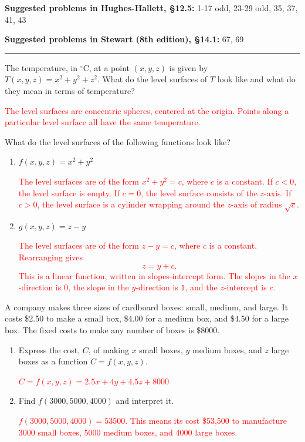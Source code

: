 \documentclass[12pt,reqno]{amsart}
\begin{document}
\textbf{Suggested problems in Hughes-Hallett, \S12.5:} 1-17 odd, 23-29 odd, 35, 37, 41, 43  \medskip

\textbf{Suggested problems in Stewart (8th edition), \S14.1:} 67, 69

\bigskip
\hrule

\bigskip

\prob The temperature, in $^\circ$C, at a point $(x,y,z)$ is given by $T(x,y,z) = x^2+y^2+z^2$. What do the level surfaces of $T$ look like and what do they mean in terms of temperature?

\bigskip
\textcolor{red}{The level surfaces are concentric spheres, centered at the origin. Points along a particular level surface all have the same temperature.}
\bigskip

\prob What do the level surfaces of the following functions look like?

\medskip
\begin{enumerate}
\item $f(x,y,z) = x^2+y^2$

\bigskip
\textcolor{red}{The level surfaces are of the form $x^2+y^2=c$, where $c$ is a constant. If $c<0$, the level surface is empty. If $c=0$, the level surface consists of the $z$-axis. If $c>0$, the level surface is a cylinder wrapping around the $z$-axis of radius $\sqrt{c}$.}
\bigskip

\item $g(x,y,z) = z-y$

\bigskip
\textcolor{red}{The level surfaces are of the form $z-y=c$, where $c$ is a constant. Rearranging gives
	\[z = y + c.
	\]
This is a linear function, written in slopes-intercept form. The slopes in the $x$-direction is $0$, the slope in the $y$-direction is $1$, and the $z$-intercept is $c$.}
\bigskip
\end{enumerate}

\prob A company makes three sizes of cardboard boxes: small, medium, and large. It costs \$2.50 to make a small box, \$4.00 for a medium box, and \$4.50 for a large box. The fixed costs to make any number of boxes is \$8000.

\medskip
\begin{enumerate}
\item Express the cost, $C$, of making $x$ small boxes, $y$ medium boxes, and $z$ large boxes as a function $C = f(x,y,z)$.

\bigskip
\textcolor{red}{$C = f(x,y,z) = 2.5x + 4y + 4.5z + 8000$}
\bigskip

\item Find $f(3000,5000,4000)$ and interpret it.

\bigskip
\textcolor{red}{$f(3000,5000,4000) = 53500$. This means its cost \$53,500 to manufacture 3000 small boxes, 5000 medium boxes, and 4000 large boxes.}
\bigskip

\end{enumerate}
\end{document}
